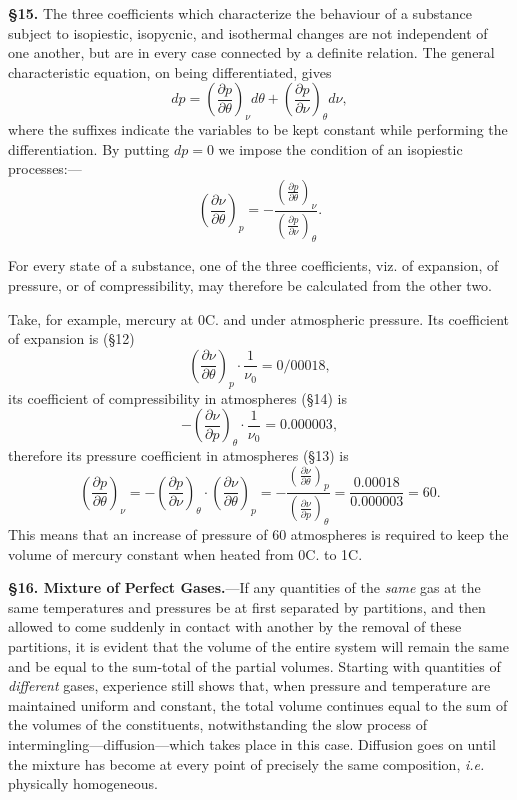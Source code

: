 \documentclass[oneside,12pt]{book}
\begin{document}
\textbf{\S 15.} The three coefficients which characterize the behaviour of a substance subject to isopiestic, isopycnic, and isothermal changes are not independent of one another, but are in every case connected by a definite relation. The general characteristic equation, on being differentiated, gives 
$$dp=\left(\frac{\partial p}{\partial \theta}\right)_\nu d\theta+\left(\frac{\partial p}{\partial\nu}\right)_\theta d\nu,$$
where the suffixes indicate the variables to be kept constant while performing the differentiation. By putting $dp=0$ we impose the condition of an isopiestic processes:---
\begin{equation}
    \left(\frac{\partial\nu}{\partial\theta}\right)_p=-\frac{\left(\frac{\partial p}{\partial\theta}\right)_\nu}{\left(\frac{\partial p}{\partial\nu}\right)_\theta}.
    \label{eq6}
\end{equation} \par 

For every state of a substance, one of the three coefficients, viz. of expansion, of pressure, or of compressibility, may therefore be calculated from the other two. \par 

Take, for example, mercury at 0\degree C. and under atmospheric pressure. Its coefficient of expansion is (\S 12)
\begin{equation*}
    \left(\frac{\partial\nu}{\partial\theta}\right)_p\cdot\frac{1}{\nu_0}=0/00018,
\end{equation*}
its coefficient of compressibility in atmospheres (\S 14) is 
$$-\left(\frac{\partial\nu}{\partial p}\right)_\theta\cdot\frac{1}{\nu_0}=0.000003,$$
therefore its pressure coefficient in atmospheres (\S 13) is 
$$\left(\frac{\partial p}{\partial\theta}\right)_\nu=-\left(\frac{\partial p}{\partial\nu}\right)_\theta\cdot\left(\frac{\partial \nu}{\partial\theta}\right)_p=-\frac{\left(\frac{\partial\nu}{\partial\theta}\right)_p}{\left(\frac{\partial\nu}{\partial p}\right)_\theta}=\frac{0.00018}{0.000003}=60.$$
This means that an increase of pressure of 60 atmospheres is required to keep the volume of mercury constant when heated from 0\degree C. to 1\degree C. \par 

\textbf{\S 16. Mixture of Perfect Gases.}---If any quantities of the \textit{same} gas at the same temperatures and pressures be at first separated by partitions, and then allowed to come suddenly in contact with another by the removal of these partitions, it is evident that the volume of the entire system will remain the same and be equal to the sum-total of the partial volumes. Starting with quantities of \textit{different} gases, experience still shows that, when pressure and temperature are maintained uniform and constant, the total volume continues equal to the sum of the volumes of the constituents, notwithstanding the slow process of intermingling---diffusion---which takes place in this case. Diffusion goes on until the mixture has become at every point of precisely the same composition, \textit{i.e.} physically homogeneous. \par 
\end{document}
